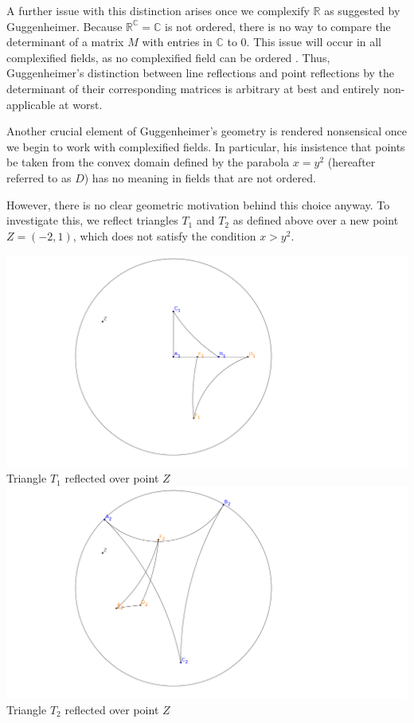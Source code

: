 \documentclass[12pt]{article}
\newcommand{\R}{\mathbb{R}}
\newcommand{\C}{\mathbb{C}}
\theoremstyle{plain}
\theoremstyle{definition}
\begin{document}
A further issue with this distinction arises once we complexify $\R$ as suggested by Guggenheimer. Because $\R^{\C} = \C$ is not ordered, there is no way to compare the determinant of a matrix $M$ with entries in $\C$ to 0. This issue will occur in all complexified fields, as no complexified field can be ordered \cite{marsden_complex_book}. Thus, Guggenheimer's distinction between line reflections and point reflections by the determinant of their corresponding matrices is arbitrary at best and entirely non-applicable at worst.

Another crucial element of Guggenheimer's geometry is rendered nonsensical once we begin to work with complexified fields. In particular, his insistence that points be taken from the convex domain defined by the parabola $x = y^2$ (hereafter referred to as $D$) has no meaning in fields that are not ordered.

However, there is no clear geometric motivation behind this choice anyway. To investigate this, we reflect triangles $T_1$ and $T_2$ as defined above over a new point $Z = (-2, 1)$, which does not satisfy the condition $x > y^2$. 

\begin{center}
\includegraphics[width=165mm]{../images/t1_over_z.png} \\
Triangle $T_1$ reflected over point $Z$
\[\]
\includegraphics[width=165mm]{../images/t2_over_z.png} \\
Triangle $T_2$ reflected over point $Z$  
\end{center}
\end{document}
